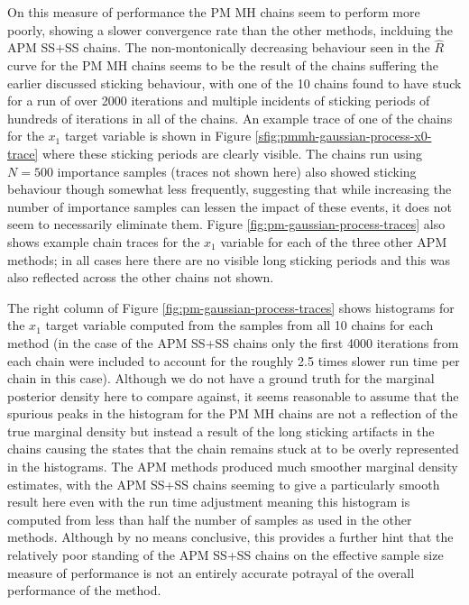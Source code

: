 On this measure of performance the \ac{PM} \ac{MH} chains seem to perform more poorly, showing a slower convergence rate than the other methods, inclduing the \ac{APM} \ac{SS}+\ac{SS} chains. The non-montonically decreasing behaviour seen in the $\hat{R}$ curve for the \ac{PM} \ac{MH} chains seems to be the result of the chains suffering the earlier discussed sticking behaviour, with one of the 10 chains found to have stuck for a run of over 2000 iterations and multiple incidents of sticking periods of hundreds of iterations in all of the chains. An example trace of one of the chains for the $x_1$ target variable is shown in Figure \ref{sfig:pmmh-gaussian-process-x0-trace} where these sticking periods are clearly visible. The chains run using $N=500$ importance samples (traces not shown here) also showed sticking behaviour though somewhat less frequently, suggesting that while increasing the number of importance samples can lessen the impact of these events, it does not seem to necessarily eliminate them. Figure \ref{fig:pm-gaussian-process-traces} also shows example chain traces for the $x_1$ variable for each of the three other \ac{APM} methods; in all cases here there are no visible long sticking periods and this was also reflected across the other chains not shown. 

The right column of Figure \ref{fig:pm-gaussian-process-traces} shows histograms for the $x_1$ target variable computed from the samples from all 10 chains for each method (in the case of the \ac{APM} \ac{SS}+\ac{SS} chains only the first 4000 iterations from each chain were included to account for the roughly 2.5 times slower run time per chain in this case). Although we do not have a ground truth for the marginal posterior density here to compare against, it seems reasonable to assume that the spurious peaks in the histogram for the \ac{PM} \ac{MH} chains are not a reflection of the true marginal density but instead a result of the long sticking artifacts in the chains causing the states that the chain remains stuck at to be overly represented in the histograms. The \ac{APM} methods produced much smoother marginal density estimates, with the \ac{APM} \ac{SS}+\ac{SS} chains seeming to give a particularly smooth result here even with the run time adjustment meaning this histogram is computed from less than half the number of samples as used in the other methods. Although by no means conclusive, this provides a further hint that the relatively poor standing of the \ac{APM} \ac{SS}+\ac{SS} chains on the effective sample size measure of performance is not an entirely accurate potrayal of the overall performance of the method. 


